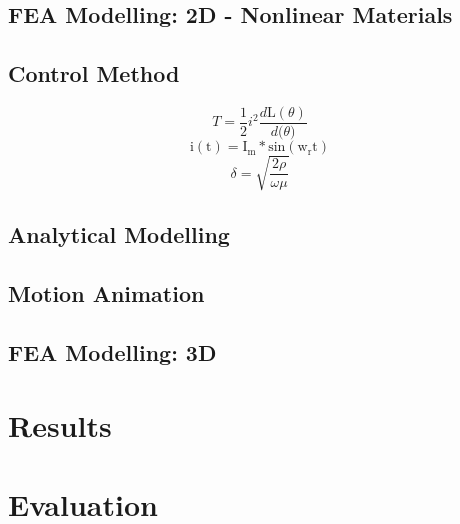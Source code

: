 \documentclass[a4paper, 11pt]{article}
\begin{document}
\subsection{FEA Modelling: 2D - Nonlinear Materials}
\subsection{Control Method}

\begin{equation}
\label{skineffect}
	T=\frac{1}{2}i^2\frac{d\mathrm L(\theta)}{d\mathrm (\theta)}
    \label{biotsavart}
\end{equation}
\begin{equation}
\label{skineffect}
	\mathrm{i(t)}=\mathrm{I_m}*\mathrm{sin(w_rt)}
\end{equation}
\begin{equation}
    \delta=\sqrt{\frac{2\rho}{\omega\mu}}
\end{equation}

\subsection{Analytical Modelling}
\subsection{Motion Animation}
\subsection{FEA Modelling: 3D}
\section{Results}
\section{Evaluation}
\end{document}
